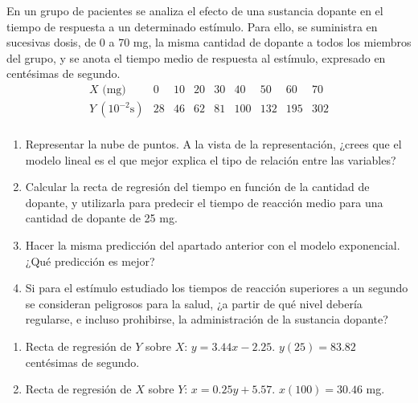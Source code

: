 {En un grupo de pacientes se analiza el efecto de una sustancia dopante en el tiempo de respuesta a un determinado estímulo. Para ello, se
suministra en sucesivas dosis, de 0 a 70 mg, la misma cantidad de dopante a todos los miembros del grupo, y se anota el tiempo medio de
respuesta al estímulo, expresado en centésimas de segundo.
\[
\begin{array}{l|r|r|r|r|r|r|r|r}
X \text{ (mg)} & 0 & 10 & 20 & 30 & 40 & 50 & 60 & 70 \\
\hline
Y\ (10^{-2}\text{s}) & 28 & 46 & 62 & 81 & 100 & 132 & 195 & 302 \\
\end{array}
\]

\begin{enumerate}
\item Representar la nube de puntos. A la vista de la representación, ¿crees que el modelo lineal es el que mejor explica el tipo de
relación entre las variables?

\item Calcular la recta de regresión del tiempo en función de la cantidad de dopante, y utilizarla para predecir el tiempo de reacción medio
para una cantidad de dopante de 25 mg.

\item Hacer la misma predicción del apartado anterior con el modelo exponencial. ¿Qué predicción es mejor?

\item Si para el estímulo estudiado los tiempos de reacción superiores a un segundo se consideran peligrosos para la salud, ¿a partir de qué
nivel debería regularse, e incluso prohibirse, la administración de la sustancia dopante?

\end{enumerate}
}
{\begin{enumerate}[start=2]
\item Recta de regresión de $Y$ sobre $X$: $y=3.44x-2.25$. $y(25)=83.82$ centésimas de segundo.
\item Recta de regresión de $X$ sobre $Y$: $x=0.25y+5.57$. $x(100)=30.46$ mg.
\end{enumerate}
}
